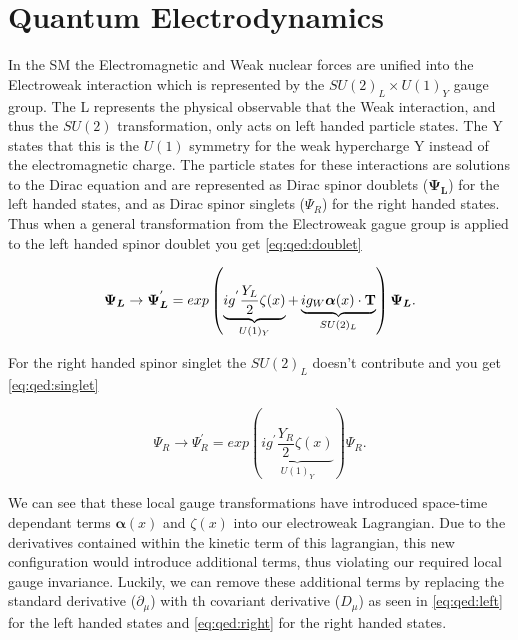 \section{Quantum Electrodynamics} \label{sec:theory:qed}

In the SM the Electromagnetic and Weak nuclear forces are unified into the
Electroweak interaction which is represented by the $SU(2)_L \times U(1)_Y$
gauge group. The L represents the physical observable that the Weak interaction,
and thus the $SU(2)$ transformation, only acts on left handed particle states.
The Y states that this is the $U(1)$ symmetry for the weak hypercharge Y instead
of the electromagnetic charge.  The particle states for these interactions are
solutions to the Dirac equation and are represented as Dirac spinor doublets
($\boldsymbol{\Psi_L}$) for the left handed states, and as Dirac spinor singlets
($\Psi_R$) for the right handed states.  Thus when a general transformation from
the Electroweak gague group is applied to the left handed spinor doublet you get
\cref{eq:qed:doublet}

\begin{equation} \label{eq:qed:doublet} 
\boldsymbol{\Psi_L} \rightarrow \boldsymbol{\Psi_L}^{'} = exp \left(
\underbrace{ ig^{'} \frac{Y_L}{2}
\zeta (x) }_{U(1)_Y} + \underbrace{ ig_{W} \boldsymbol{\alpha}(x) \cdot
\text{\bf{T}} }_{SU(2)_L} \right) \boldsymbol{\Psi_L}.
\end{equation}

For the right handed spinor singlet the $SU(2)_L$ doesn't contribute and
you get \cref{eq:qed:singlet}

\begin{equation} \label{eq:qed:singlet} 
{\Psi_R} \rightarrow \Psi_R^{'} = exp \left( \underbrace{ ig^{'} \frac{Y_R}{2}
\zeta (x) }_{U(1)_Y} \right) \Psi_R.
\end{equation}

We can see that these local gauge transformations have introduced space-time
dependant terms $\boldsymbol{\alpha}(x)$ and $\zeta(x)$ into our electroweak
Lagrangian.  Due to the derivatives contained within the kinetic term of this
lagrangian, this new configuration would introduce additional terms, thus
violating our required local gauge invariance.  Luckily, we can remove these
additional terms by replacing the standard derivative ($\partial_{\mu}$) with th
covariant derivative ($D_{\mu}$) as seen in \cref{eq:qed:left} for the
left handed states and \cref{eq:qed:right} for the right handed states.

